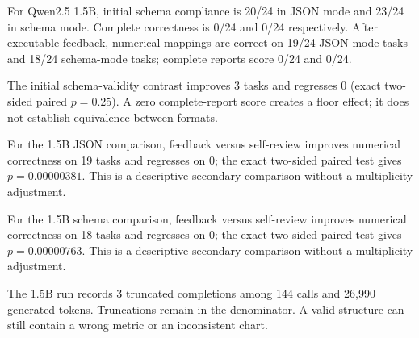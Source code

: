 For Qwen2.5 1.5B, initial schema compliance is 20/24 in JSON mode and 23/24 in schema mode. Complete correctness is 0/24 and 0/24 respectively. After executable feedback, numerical mappings are correct on 19/24 JSON-mode tasks and 18/24 schema-mode tasks; complete reports score 0/24 and 0/24.

The initial schema-validity contrast improves 3 tasks and regresses 0 (exact two-sided paired $p=0.25$). A zero complete-report score creates a floor effect; it does not establish equivalence between formats.

For the 1.5B JSON comparison, feedback versus self-review improves numerical correctness on 19 tasks and regresses on 0; the exact two-sided paired test gives $p=0.00000381$. This is a descriptive secondary comparison without a multiplicity adjustment.

For the 1.5B schema comparison, feedback versus self-review improves numerical correctness on 18 tasks and regresses on 0; the exact two-sided paired test gives $p=0.00000763$. This is a descriptive secondary comparison without a multiplicity adjustment.

The 1.5B run records 3 truncated completions among 144 calls and 26,990 generated tokens. Truncations remain in the denominator. A valid structure can still contain a wrong metric or an inconsistent chart.
